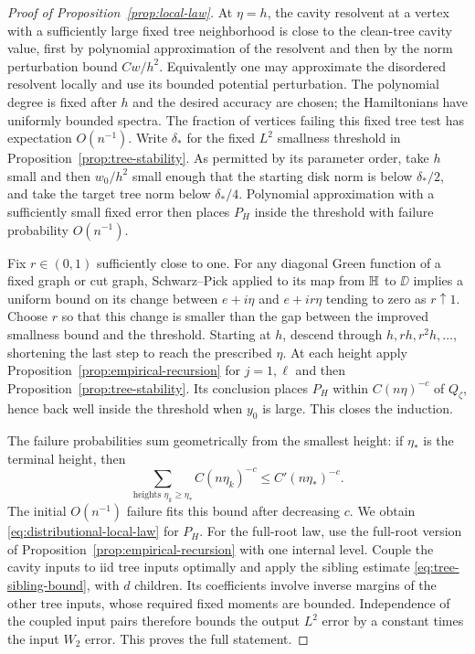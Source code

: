 \begin{proof}[Proof of Proposition~\ref{prop:local-law}]
At $\eta=h$, the cavity resolvent at a vertex with a sufficiently large
fixed tree neighborhood is close to the clean-tree cavity value,
first by polynomial approximation of the resolvent and then by the
norm perturbation bound $Cw/h^2$.  Equivalently one may approximate
the disordered resolvent locally and use its bounded potential
perturbation.  The polynomial degree is fixed after $h$ and the desired
accuracy are chosen; the Hamiltonians have uniformly bounded spectra.
The fraction of vertices failing this fixed tree test has expectation
$O(n^{-1})$.  Write $\delta_*$ for the fixed $L^2$ smallness threshold in
Proposition~\ref{prop:tree-stability}.  As permitted by its parameter
order, take $h$ small and then $w_0/h^2$ small enough that the starting
disk norm is below $\delta_*/2$, and take the target tree norm below
$\delta_*/4$.  Polynomial approximation with a sufficiently small
fixed error then places $P_H$ inside the threshold with failure
probability $O(n^{-1})$.

Fix $r\in(0,1)$ sufficiently close to one.  For any diagonal Green
function of a fixed graph or cut graph, Schwarz--Pick applied to its
map from $\mathbb H$ to $\DD$ implies a uniform bound on its change between
$e+i\eta$ and $e+ir\eta$ tending to zero as $r\uparrow1$.
Choose $r$ so that this change is smaller than the gap between the
improved smallness bound and the threshold.  Starting at $h$, descend
through $h,rh,r^2h,\ldots$, shortening the last step to reach the
prescribed $\eta$.  At each height apply
Proposition~\ref{prop:empirical-recursion} for $j=1,\ell$ and then
Proposition~\ref{prop:tree-stability}.  Its conclusion places $P_H$
within $C(n\eta)^{-c}$ of $Q_\zeta$, hence back well inside the
threshold when $y_0$ is large.  This closes the induction.

The failure probabilities sum geometrically from the smallest height:
if $\eta_*$ is the terminal height, then
\[
             \sum_{\text{heights }\eta_k\ge\eta_*}
                       C(n\eta_k)^{-c}\le C'(n\eta_*)^{-c}.
\]
The initial $O(n^{-1})$ failure fits this bound after decreasing $c$.
We obtain \eqref{eq:distributional-local-law} for $P_H$.
For the full-root law, use the full-root version of
Proposition~\ref{prop:empirical-recursion} with one internal level.
Couple the cavity inputs to iid tree inputs optimally and apply the
sibling estimate \eqref{eq:tree-sibling-bound}, with $d$ children.
Its coefficients involve inverse margins of the other tree inputs,
whose required fixed moments are bounded.  Independence of the coupled
input pairs therefore bounds the output $L^2$ error by a constant
times the input $W_2$ error.  This proves the full statement.
\end{proof}

